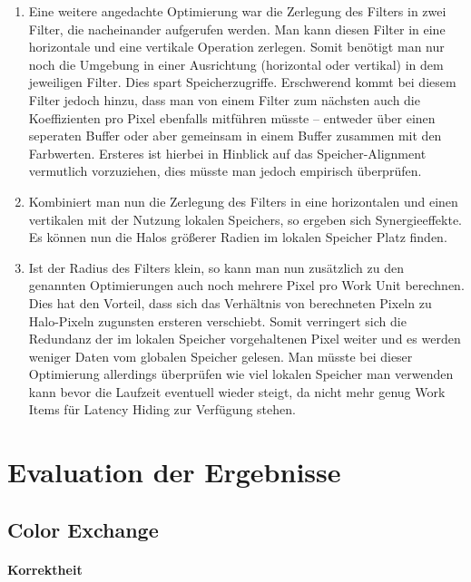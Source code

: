 \documentclass[10pt,a4paper]{article}
\begin{document}
\begin{enumerate}
\item Eine weitere angedachte Optimierung war die Zerlegung des Filters in zwei Filter, die nacheinander aufgerufen werden. Man kann diesen Filter in eine horizontale und eine vertikale Operation zerlegen. Somit benötigt man nur noch die Umgebung in einer Ausrichtung (horizontal oder vertikal) in dem jeweiligen Filter. Dies spart Speicherzugriffe. Erschwerend kommt bei diesem Filter jedoch hinzu, dass man von einem Filter zum nächsten auch die Koeffizienten pro Pixel ebenfalls mitführen müsste -- entweder über einen seperaten Buffer oder aber gemeinsam in einem Buffer zusammen mit den Farbwerten. Ersteres ist hierbei in Hinblick auf das Speicher-Alignment vermutlich vorzuziehen, dies müsste man jedoch empirisch überprüfen.


\item Kombiniert man nun die Zerlegung des Filters in eine horizontalen und einen vertikalen mit der Nutzung lokalen Speichers, so ergeben sich Synergieeffekte. Es können nun die Halos größerer Radien im lokalen Speicher Platz finden.

\item Ist der Radius des Filters klein, so kann man nun zusätzlich zu den genannten Optimierungen auch noch mehrere Pixel pro Work Unit berechnen. Dies hat den Vorteil, dass sich das Verhältnis von berechneten Pixeln zu Halo-Pixeln zugunsten ersteren verschiebt. Somit verringert sich die Redundanz der im lokalen Speicher vorgehaltenen Pixel weiter und es werden weniger Daten vom globalen Speicher gelesen. Man müsste bei dieser Optimierung allerdings überprüfen wie viel lokalen Speicher man verwenden kann bevor die Laufzeit eventuell wieder steigt, da nicht mehr genug Work Items für Latency Hiding zur Verfügung stehen.
\end{enumerate}

\section{Evaluation der Ergebnisse}
\subsection{Color Exchange}
\paragraph{Korrektheit}
\end{document}
